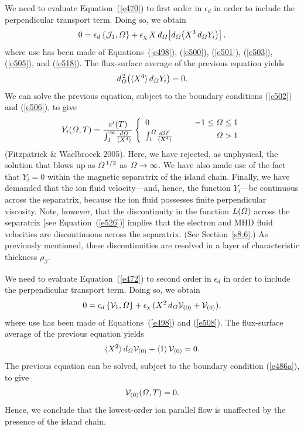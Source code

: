 \documentclass[notitlepage,12pt]{article}
\begin{document}
We need to evaluate Equation~(\ref{e470}) to first order in $\epsilon_d$ in order to include the perpendicular transport term. Doing so,
we obtain
\begin{equation}\label{e528a}
0 =\epsilon_d\,\{{\cal J}_1,{\mit\Omega}\} +\epsilon_\chi\,X\,d_{{\mit\Omega}}\!\left[d_{\mit\Omega}\!\left(X^3\,d_{\mit\Omega} Y_i\right)\right].
\end{equation}
where use has been made of Equations~(\ref{e498}), (\ref{e500}), (\ref{e501}), (\ref{e503}), (\ref{e505}), and (\ref{e518}). The flux-surface average of the previous equation yields 
\begin{equation}
d_{\mit\Omega}^{\,2}\!\left(\langle X^4\rangle\,d_{\mit\Omega} Y_i\right)= 0.
\end{equation}
We can solve the previous equation, subject to the boundary conditions (\ref{e502}) and (\ref{e506}), to give
\begin{equation}\label{e530}
Y_i({\mit\Omega},T)=\frac{v'(T)}{\int_1^\infty \!\frac{d{\mit\Omega}}{\langle X^4\rangle}}\left\{
\begin{array}{llr}
0&&-1\leq {\mit\Omega}\leq 1\\[0.5ex]
\int_1^{\mit\Omega}\! \frac{d{\mit\Omega}'}{\langle X^4\rangle}&~~&{\mit\Omega}>1
\end{array}\right.
\end{equation}
(Fitzpatrick \& Waelbroeck 2005).
Here, we have rejected, as unphysical, the solution that blows up as ${\mit\Omega}^{\,1/2}$ as ${\mit\Omega}\rightarrow\infty$. 
We have also made use of the fact that $Y_i=0$ within the magnetic separatrix of the island chain. Finally, we have  demanded that the ion
fluid velocity---and, hence, the function $Y_i$---be continuous across the separatrix, because the ion fluid possesses finite perpendicular viscosity. 
Note, however, that the discontinuity in the function $L({\mit\Omega})$ across the separatrix [see Equation~(\ref{e526})] implies that the
electron and MHD  fluid velocities are  discontinuous across the separatrix. (See Section~\ref{s8.6}.) As previously
mentioned, these discontinuities are resolved in a layer of characteristic thickness $\rho_\beta$. 

We need to evaluate Equation~(\ref{e472}) to second order in $\epsilon_d$ in order to include the perpendicular transport term. Doing so,
we obtain
\begin{equation}
0=\epsilon_d\,\{{\cal V}_1,{\mit\Omega}\} + \epsilon_\chi\,(X^2\,d_{\mit\Omega} {\cal V}_{(0)} + {\cal V}_{(0)}),
\end{equation}
where use has been made of Equations~(\ref{e498}) and (\ref{e508}). The flux-surface average of the
previous equation yields
\begin{equation}
\langle X^2\rangle\,d_{\mit\Omega} {\cal V}_{(0)} +\langle 1\rangle \,{\cal V}_{(0)}= 0.
\end{equation}
 The previous equation can be solved, subject to the boundary condition (\ref{e486a}), to
give
\begin{equation}
{\cal V}_{(0)}({\mit\Omega}, T) = 0.
\end{equation}
Hence, we conclude that the lowest-order ion parallel flow is unaffected by the presence of the island chain. 
\end{document}
